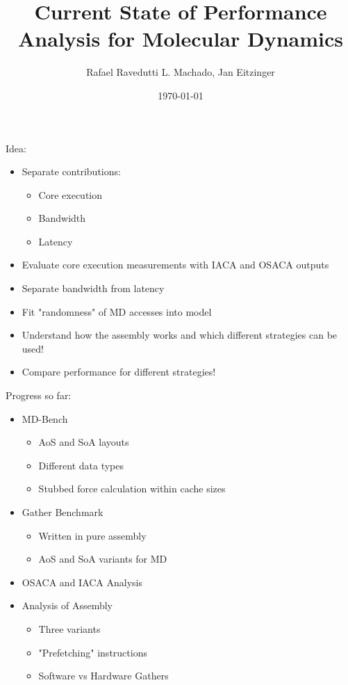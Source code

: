 \documentclass[aspectratio=169,t]{beamer}
\title[MD Performance Analysis]{Current State of Performance Analysis for Molecular Dynamics}
\author[Rafael Ravedutti L. Machado, Jan Eitzinger]{Rafael Ravedutti L. Machado, Jan Eitzinger}
\institute[NHR@FAU]{Erlangen National High Performance Computing Center (NHR@FAU)}
\date{\today}
\begin{document}
  \maketitle

  { %
    \begin{frame}[noframenumbering]{Idea:}
        \begin{itemize}
            \item Separate contributions:
            \begin{itemize}
                \item Core execution
                \item Bandwidth
                \item Latency
            \end{itemize}
            \item Evaluate core execution measurements with IACA and OSACA outputs
            \item Separate bandwidth from latency
            \item Fit "randomness" of MD accesses into model
            \item Understand how the assembly works and which different strategies can be used!
            \item Compare performance for different strategies!
        \end{itemize}
    \end{frame}
  }
  \begin{frame}[noframenumbering]{Progress so far:}
      \begin{itemize}
          \item MD-Bench
          \begin{itemize}
              \item AoS and SoA layouts
              \item Different data types
              \item Stubbed force calculation within cache sizes
          \end{itemize}
          \item Gather Benchmark
          \begin{itemize}
              \item Written in pure assembly
              \item AoS and SoA variants for MD
          \end{itemize}
          \item OSACA and IACA Analysis
          \item Analysis of Assembly
          \begin{itemize}
              \item Three variants
              \item "Prefetching" instructions
              \item Software vs Hardware Gathers
          \end{itemize}
      \end{itemize}
  \end{frame}
\end{document}
